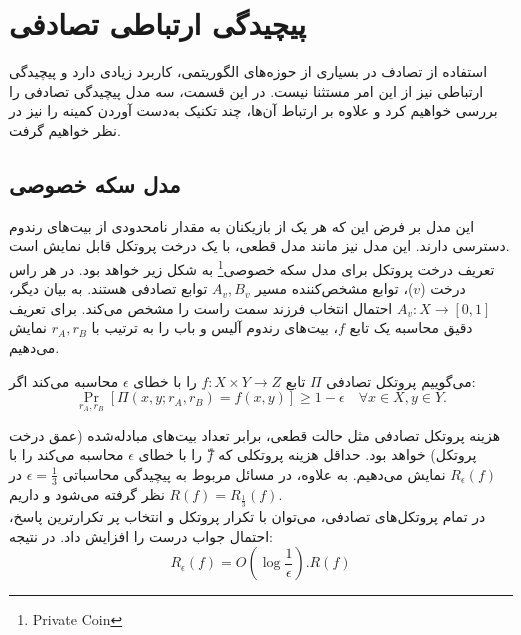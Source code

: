 \chapter{پیچیدگی ارتباطی تصادفی}\label{chapter_rand}

استفاده از تصادف در بسیاری از حوزه‌های الگوریتمی، کاربرد زیادی دارد و پیچیدگی ارتباطی نیز از این امر مستثنا نیست. در این قسمت، سه مدل پیچیدگی تصادفی را بررسی خواهیم کرد و علاوه بر ارتباط آن‌ها، چند تکنیک به‌دست آوردن کمینه را نیز در نظر خواهیم گرفت. 
 \cite{nissan09,
 		lee09,
 		tim15,
 		toni14,
 		sherstov18}
 

\section{مدل سکه خصوصی}
این مدل بر فرض این که هر یک از بازیکنان به مقدار نامحدودی از بیت‌های رندوم دسترسی دارند. این مدل نیز مانند مدل قطعی، با یک درخت پروتکل قابل نمایش است.\\
تعریف درخت پروتکل برای مدل سکه خصوصی\footnote{Private Coin} به شکل زیر خواهد بود. در هر راس درخت ($v$)، توابع مشخص‌کننده مسیر $A_v , B_v$ توابع تصادفی هستند. به بیان دیگر، $A_v : X \rightarrow [0,1] $ احتمال انتخاب فرزند سمت راست را مشخص می‌کند. برای تعریف دقیق محاسبه یک تابع $f$، بیت‌های رندوم آلیس و باب را به ترتیب با $r_A, r_B$ نمایش می‌دهیم. \\
\begin{definition}
می‌گوییم پروتکل تصادفی $\Pi$ تابع $f : X \times Y \rightarrow Z$ را با خطای $\epsilon$ محاسبه می‌کند اگر:
\begin{equation}
\Pr_{r_A, r_B} [\Pi(x, y; r_A, r_B) = f(x,y)] \geq 1 - \epsilon \quad \forall x \in X, y \in Y.
\end{equation}
\end{definition}
هزینه پروتکل تصادفی مثل حالت قطعی، برابر تعداد بیت‌های مبادله‌شده (عمق درخت پروتکل) خواهد بود. حداقل هزینه پروتکلی که $ّf$ را با خطای $\epsilon$ محاسبه می‌کند را با $R_\epsilon(f)$ نمایش می‌دهیم. به علاوه، در مسائل مربوط به پیچیدگی محاسباتی $\epsilon = \frac{1}{3}$ در نظر گرفته می‌شود و داریم $R(f) = R_{\frac{1}{3}}(f)$.\\
در تمام پروتکل‌های تصادفی، می‌توان با تکرار پروتکل و انتخاب پر تکرارترین پاسخ، احتمال جواب درست را افزایش داد. در نتیجه:
\begin{equation}
R_{\epsilon}(f) = O(\log \frac{1}{\epsilon}) . R(f)
\end{equation}

